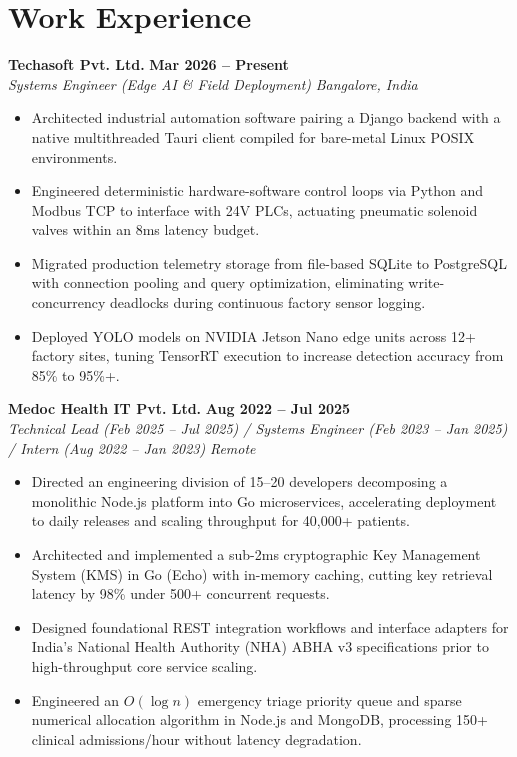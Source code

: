 \documentclass[10pt,a4paper]{article}
\begin{document}
\section*{Work Experience}

\textbf{Techasoft Pvt. Ltd.} \hfill \textbf{Mar 2026 – Present} \\
\textit{Systems Engineer (Edge AI \& Field Deployment)} \hfill \textit{Bangalore, India}
\begin{itemize}
  \item Architected industrial automation software pairing a Django backend with a native multithreaded Tauri client compiled for bare-metal Linux POSIX environments.
  \item Engineered deterministic hardware-software control loops via Python and Modbus TCP to interface with 24V PLCs, actuating pneumatic solenoid valves within an 8ms latency budget.
  \item Migrated production telemetry storage from file-based SQLite to PostgreSQL with connection pooling and query optimization, eliminating write-concurrency deadlocks during continuous factory sensor logging.
  \item Deployed YOLO models on NVIDIA Jetson Nano edge units across 12+ factory sites, tuning TensorRT execution to increase detection accuracy from 85\% to 95\%+.
\end{itemize}

\vspace{2pt}
\textbf{Medoc Health IT Pvt. Ltd.} \hfill \textbf{Aug 2022 – Jul 2025} \\
\textit{Technical Lead (Feb 2025 – Jul 2025) / Systems Engineer (Feb 2023 – Jan 2025) / Intern (Aug 2022 – Jan 2023)} \hfill \textit{Remote}
\begin{itemize}
  \item Directed an engineering division of 15--20 developers decomposing a monolithic Node.js platform into Go microservices, accelerating deployment to daily releases and scaling throughput for 40,000+ patients.
  \item Architected and implemented a sub-2ms cryptographic Key Management System (KMS) in Go (Echo) with in-memory caching, cutting key retrieval latency by 98\% under 500+ concurrent requests.
  \item Designed foundational REST integration workflows and interface adapters for India's National Health Authority (NHA) ABHA v3 specifications prior to high-throughput core service scaling.
  \item Engineered an $O(\log n)$ emergency triage priority queue and sparse numerical allocation algorithm in Node.js and MongoDB, processing 150+ clinical admissions/hour without latency degradation.
\end{itemize}
\end{document}
